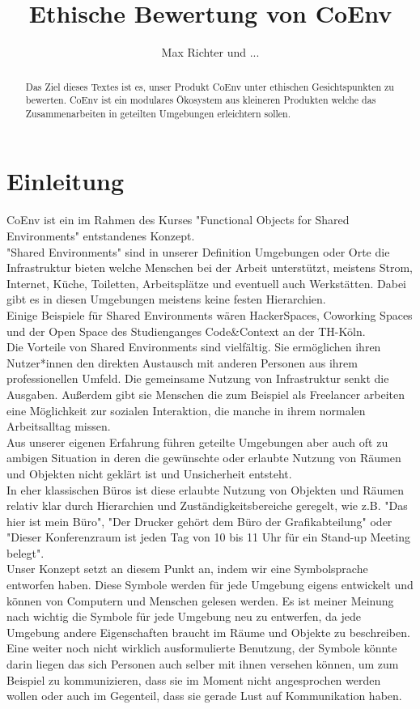 \documentclass{article}
\title{Ethische Bewertung von CoEnv}
\author{Max Richter und ...}
\begin{document}
\maketitle

\begin{abstract}
Das Ziel dieses Textes ist es, unser Produkt CoEnv unter ethischen Gesichtspunkten zu bewerten. CoEnv ist ein modulares Ökosystem aus kleineren Produkten welche das Zusammenarbeiten in geteilten Umgebungen erleichtern sollen.
\end{abstract}

\newpage
\tableofcontents
\newpage

\section{Einleitung}

CoEnv ist ein im Rahmen des Kurses "Functional Objects for Shared Environments" entstandenes Konzept.
\\[2ex]
"Shared Environments" sind in unserer Definition Umgebungen oder Orte die Infrastruktur bieten welche Menschen bei der Arbeit unterstützt, meistens Strom, Internet, Küche, Toiletten, Arbeitsplätze und eventuell auch Werkstätten. Dabei gibt es in diesen Umgebungen meistens keine festen Hierarchien.
\\[2ex]
Einige Beispiele für Shared Environments wären HackerSpaces, Coworking Spaces und der Open Space des Studienganges Code\&Context an der TH-Köln.
\\[2ex]
Die Vorteile von Shared Environments sind vielfältig. Sie ermöglichen ihren Nutzer*innen den direkten Austausch mit anderen Personen aus ihrem professionellen Umfeld. Die gemeinsame Nutzung von Infrastruktur senkt die Ausgaben. Außerdem gibt sie Menschen die zum Beispiel als Freelancer arbeiten eine Möglichkeit zur sozialen Interaktion, die manche in ihrem normalen Arbeitsalltag missen.
\\[2ex]
Aus unserer eigenen Erfahrung führen geteilte Umgebungen aber auch oft zu ambigen Situation in deren die gewünschte oder erlaubte Nutzung von Räumen und Objekten nicht geklärt ist und Unsicherheit entsteht.
\\[2ex]
In eher klassischen Büros ist diese erlaubte Nutzung von Objekten und Räumen relativ klar durch Hierarchien und Zuständigkeitsbereiche geregelt, wie z.B. "Das hier ist mein Büro", "Der Drucker gehört dem Büro der Grafikabteilung" oder "Dieser Konferenzraum ist jeden Tag von 10 bis 11 Uhr für ein Stand-up Meeting belegt".
\\[2ex]
Unser Konzept setzt an diesem Punkt an, indem wir eine Symbolsprache entworfen haben. Diese Symbole werden für jede Umgebung eigens entwickelt und können von Computern und Menschen gelesen werden. Es ist meiner Meinung nach wichtig die Symbole für jede Umgebung neu zu entwerfen, da jede Umgebung andere Eigenschaften braucht im Räume und Objekte zu beschreiben.
\\[2ex]
Eine weiter noch nicht wirklich ausformulierte Benutzung, der Symbole könnte darin liegen das sich Personen auch selber mit ihnen versehen können, um zum Beispiel zu kommunizieren, dass sie im Moment nicht angesprochen werden wollen oder auch im Gegenteil, dass sie gerade Lust auf Kommunikation haben. 
\end{document}

